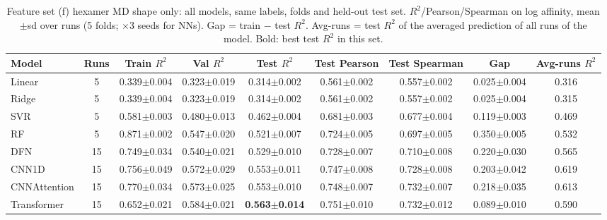 \begin{table}[H]\centering\scriptsize\setlength{\tabcolsep}{3pt}
\caption{Feature set (f) hexamer MD shape only: all models, same labels, folds and held-out test set. $R^2$/Pearson/Spearman on log affinity, mean$\pm$sd over runs (5 folds; $\times$3 seeds for NNs). Gap = train $-$ test $R^2$. Avg-runs = test $R^2$ of the averaged prediction of all runs of the model. Bold: best test $R^2$ in this set.}
\begin{tabular}{lcccccccc}\toprule
Model & Runs & Train $R^2$ & Val $R^2$ & Test $R^2$ & Test Pearson & Test Spearman & Gap & Avg-runs $R^2$\\\midrule
Linear & 5 & 0.339$\pm$0.004 & 0.323$\pm$0.019 & 0.314$\pm$0.002 & 0.561$\pm$0.002 & 0.557$\pm$0.002 & 0.025$\pm$0.004 & 0.316 \\
Ridge & 5 & 0.339$\pm$0.004 & 0.323$\pm$0.019 & 0.314$\pm$0.002 & 0.561$\pm$0.002 & 0.557$\pm$0.002 & 0.025$\pm$0.004 & 0.315 \\
SVR & 5 & 0.581$\pm$0.003 & 0.480$\pm$0.013 & 0.462$\pm$0.004 & 0.681$\pm$0.003 & 0.677$\pm$0.004 & 0.119$\pm$0.003 & 0.469 \\
RF & 5 & 0.871$\pm$0.002 & 0.547$\pm$0.020 & 0.521$\pm$0.007 & 0.724$\pm$0.005 & 0.697$\pm$0.005 & 0.350$\pm$0.005 & 0.532 \\
DFN & 15 & 0.749$\pm$0.034 & 0.540$\pm$0.021 & 0.529$\pm$0.010 & 0.728$\pm$0.007 & 0.710$\pm$0.008 & 0.220$\pm$0.030 & 0.565 \\
CNN1D & 15 & 0.756$\pm$0.049 & 0.572$\pm$0.029 & 0.553$\pm$0.011 & 0.747$\pm$0.008 & 0.728$\pm$0.008 & 0.203$\pm$0.042 & 0.619 \\
CNNAttention & 15 & 0.770$\pm$0.034 & 0.573$\pm$0.025 & 0.553$\pm$0.010 & 0.748$\pm$0.007 & 0.732$\pm$0.007 & 0.218$\pm$0.035 & 0.613 \\
Transformer & 15 & 0.652$\pm$0.021 & 0.584$\pm$0.021 & \textbf{0.563$\pm$0.014} & 0.751$\pm$0.010 & 0.732$\pm$0.012 & 0.089$\pm$0.010 & 0.590 \\
\bottomrule\end{tabular}\label{tab:fs_hexamerMD}\end{table}

